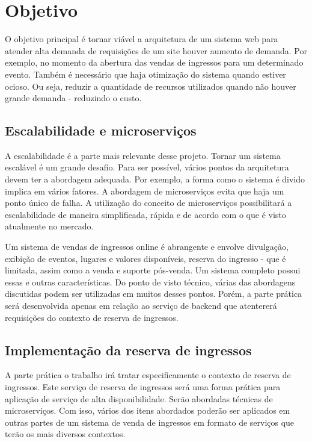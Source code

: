 \chapter{Objetivo}

O objetivo principal é tornar viável a arquitetura de um sistema web para atender
alta demanda de requisições de um site houver aumento de demanda.
Por exemplo, no momento da abertura das vendas de ingressos para um determinado evento.
Também é necessário que haja otimização do sistema quando estiver ocioso.
Ou seja, reduzir a quantidade de recursos utilizados quando não houver
grande demanda - reduzindo o custo.

\section{Escalabilidade e microserviços}
A escalabilidade é a parte mais relevante desse projeto. Tornar um sistema escalável
é um grande desafio. Para ser possível, vários pontos da arquitetura devem ter a
abordagem adequada. Por exemplo, a forma como o sistema é divido implica em vários
fatores. A abordagem de microserviços evita que haja um ponto único de falha. A
utilização do conceito de microserviços possibilitará a escalabilidade de maneira
simplificada, rápida e de acordo com o que é visto atualmente no mercado.

Um sistema de vendas de ingressos online é abrangente e envolve divulgação,
exibição de eventos, lugares e valores disponíveis, reserva do ingresso -
que é limitada, assim como a venda e suporte pós-venda. Um sistema completo possui essas
e outras características. Do ponto de visto técnico, várias das abordagens discutidas
podem ser utilizadas em muitos desses pontos. Porém, a parte prática será desenvolvida
apenas em relação ao serviço de backend que atentererá requisições do contexto de reserva
de ingressos.

\section{Implementação da reserva de ingressos}

A parte prática o trabalho irá tratar especificamente o contexto de reserva de ingressos.
Este serviço de reserva de ingressos será uma forma prática para aplicação
de serviço de alta disponibilidade. Serão abordadas técnicas de microserviços.
Com isso, vários dos itens abordados poderão ser aplicados em outras partes de um sistema
de venda de ingressos em formato de serviços que terão os mais diversos contextos.

